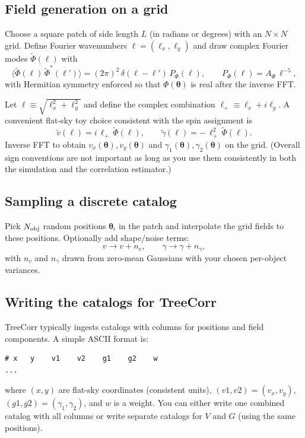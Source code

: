 \documentclass[11pt]{article}
\begin{document}
\subsection{Field generation on a grid}
Choose a square patch of side length $L$ (in radians or degrees) with an $N\times N$ grid.
Define Fourier wavenumbers $\boldsymbol\ell=(\ell_x,\ell_y)$ and draw complex Fourier modes $\tilde\Phi(\boldsymbol\ell)$ with
\[
  \langle \tilde\Phi(\boldsymbol\ell)\,\tilde\Phi^*(\boldsymbol\ell')\rangle = (2\pi)^2\,\delta(\boldsymbol\ell-\boldsymbol\ell')\,P_\Phi(\ell),
  \qquad P_\Phi(\ell)=A_\Phi\,\ell^{-5},
\]
with Hermitian symmetry enforced so that $\Phi(\boldsymbol\theta)$ is real after the inverse FFT.

Let $\ell\equiv\sqrt{\ell_x^2+\ell_y^2}$ and define the complex combination $\ell_+\equiv \ell_x+i\ell_y$.
A convenient flat-sky toy choice consistent with the spin assignment is
\[
  \tilde v(\boldsymbol\ell) = i\,\ell_+\,\tilde\Phi(\boldsymbol\ell),
  \qquad
  \tilde\gamma(\boldsymbol\ell) = -\,\ell_+^2\,\tilde\Phi(\boldsymbol\ell).
\]
Inverse FFT to obtain $v_x(\boldsymbol\theta),v_y(\boldsymbol\theta)$ and $\gamma_1(\boldsymbol\theta),\gamma_2(\boldsymbol\theta)$ on the grid.
(Overall sign conventions are not important as long as you use them consistently in both the simulation and the correlation estimator.)

\subsection{Sampling a discrete catalog}
Pick $N_{\rm obj}$ random positions $\boldsymbol\theta_i$ in the patch and interpolate the grid fields to these positions.
Optionally add shape/noise terms:
\[
  v \to v + n_v,\qquad \gamma \to \gamma + n_\gamma,
\]
with $n_v$ and $n_\gamma$ drawn from zero-mean Gaussians with your chosen per-object variances.

\subsection{Writing the catalogs for TreeCorr}
TreeCorr typically ingests catalogs with columns for positions and field components.
A simple ASCII format is:
\begin{verbatim}
# x   y    v1    v2    g1    g2    w
...
\end{verbatim}
where $(x,y)$ are flat-sky coordinates (consistent units), $(v1,v2)=(v_x,v_y)$, $(g1,g2)=(\gamma_1,\gamma_2)$, and $w$ is a weight.
You can either write one combined catalog with all columns or write separate catalogs for $V$ and $G$ (using the same positions).
\end{document}
